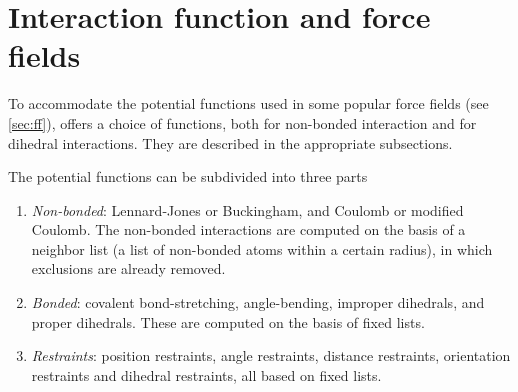 %
%
%
%
%
%
%

\chapter{Interaction function and force fields}
\label{ch:ff}
To accommodate the potential functions used
in some popular force fields (see \ref{sec:ff}), {\gromacs} offers a choice of functions,
both for non-bonded interaction and for dihedral interactions. They
are described in the appropriate subsections.

The potential functions can be subdivided into three parts
\begin{enumerate}
\item   {\em Non-bonded}: Lennard-Jones or Buckingham, and Coulomb or
modified Coulomb. The non-bonded interactions are computed on the
basis of a neighbor list (a list of non-bonded atoms within a certain
radius), in which exclusions are already removed.
\item   {\em Bonded}: covalent bond-stretching, angle-bending,
improper dihedrals, and proper dihedrals. These are computed on the
basis of fixed lists. 
\item   {\em Restraints}: position restraints, angle restraints,
distance restraints, orientation restraints and dihedral restraints, all
based on fixed lists. 
\end{enumerate}


